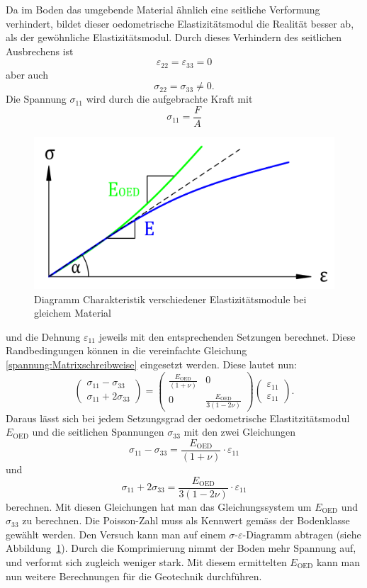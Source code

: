 Da im Boden das umgebende Material ähnlich eine seitliche Verformung verhindert,
bildet dieser oedometrische Elastizitätsmodul die Realität besser ab, als der gewöhnliche Elastizitätsmodul.
Durch dieses Verhindern des seitlichen Ausbrechens ist
\[
\varepsilon_{22}
=
\varepsilon_{33}
=
0
\]
aber auch
\[
\sigma_{22}
=
\sigma_{33}
\neq 0
.
\]
Die Spannung $\sigma_{11}$ wird durch die aufgebrachte Kraft mit
\[
\sigma_{11}
=
\frac{F}{A}
\]
\begin{figure}
	\centering
	\includegraphics[width=0.45\linewidth,keepaspectratio]{papers/spannung/Grafiken/DiagrammOedometer-Versuch.png}
	\caption{Diagramm Charakteristik verschiedener Elastizitätsmodule bei gleichem Material}
	\label{fig:DiagrammOedometer-Versuch}
\end{figure}%
und die Dehnung $\varepsilon_{11}$ jeweils mit den entsprechenden Setzungen berechnet.
Diese Randbedingungen können in die vereinfachte Gleichung \eqref{spannung:Matrixschreibweise} eingesetzt werden.
Diese lautet nun:
\[
\begin{pmatrix}
	\sigma_{11}-\sigma_{33} \\
	\sigma_{11}+2\sigma_{33}
\end{pmatrix}
=
\begin{pmatrix}
	\displaystyle{\frac{E_{\text{OED}}}{(1+\nu)}} &                                               0 \\
                                                0 & \displaystyle{\frac{E_{\text{OED}}}{3(1-2\nu)}}
\end{pmatrix}
\begin{pmatrix}
	\varepsilon_{11}\\
	\varepsilon_{11}
\end{pmatrix}
.
\]
Daraus lässt sich bei jedem Setzungsgrad der oedometrische Elastitzitätsmodul $E_{\text{OED}}$ und die seitlichen Spannungen $\sigma_{33}$ mit den zwei Gleichungen
\[
\sigma_{11}-\sigma_{33}
=
\frac{E_{\text{OED}}}{(1+\nu)}\cdot\varepsilon_{11}
\]
und
\[
\sigma_{11}+2\sigma_{33}
=
\frac{E_{\text{OED}}}{3(1-2\nu)}\cdot\varepsilon_{11}
\]
berechnen.
Mit diesen Gleichungen hat man das Gleichungssystem um $E_{\text{OED}}$ und $\sigma_{33}$ zu berechnen.
Die Poisson-Zahl muss als Kennwert gemäss der Bodenklasse gewählt werden.
Den Versuch kann man auf einem $\sigma$-$\varepsilon$-Diagramm abtragen (siehe Abbildung~\ref{fig:DiagrammOedometer-Versuch}).
Durch die Komprimierung nimmt der Boden mehr Spannung auf, und verformt sich zugleich weniger stark.
Mit diesem ermittelten $E_{\text{OED}}$ kann man nun weitere Berechnungen für die Geotechnik durchführen.

